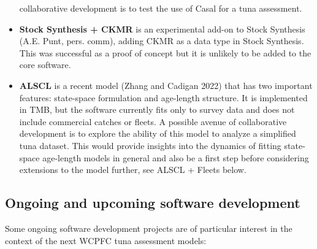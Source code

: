 \documentclass{SCreport}
\begin{document}
\begin{itemize}
  collaborative development is to test the use of Casal for a tuna assessment.
  \newpage
  \item \textbf{Stock Synthesis + CKMR} is an experimental add-on to Stock
  Synthesis (A.E. Punt, pers. comm), adding CKMR as a data type in Stock
  Synthesis. This was successful as a proof of concept but it is unlikely to be
  added to the core software.
  \item \textbf{ALSCL} is a recent model (Zhang and Cadigan 2022) that has two
  important features: state-space formulation and age-length structure. It is
  implemented in TMB, but the software currently fits only to survey data and
  does not include commercial catches or fleets. A possible avenue of
  collaborative development is to explore the ability of this model to analyze a
  simplified tuna dataset. This would provide insights into the dynamics of
  fitting state-space age-length models in general and also be a first step
  before considering extensions to the model further, see ALSCL + Fleets below.
\end{itemize}

\subsection{Ongoing and upcoming software development}
\label{sec:ongoing-upcoming-development}

Some ongoing software development projects are of particular interest in the
context of the next WCPFC tuna assessment models:
\end{document}
